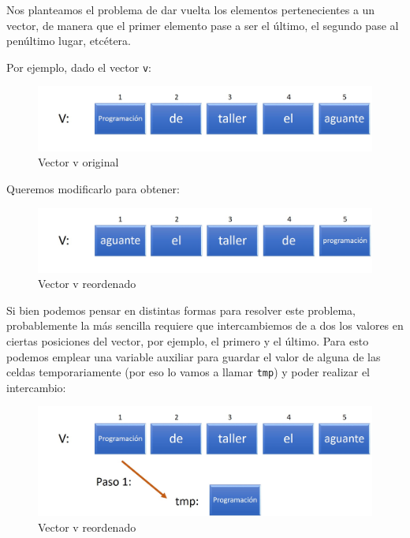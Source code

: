 \documentclass[]{book}
\begin{document}
Nos planteamos el problema de dar vuelta los elementos pertenecientes a
un vector, de manera que el primer elemento pase a ser el último, el
segundo pase al penúltimo lugar, etcétera.

Por ejemplo, dado el vector \texttt{v}:

\begin{figure}

{\centering \includegraphics[width=0.8\linewidth]{images/14_invertir1} 

}

\caption{Vector v original}\label{fig:inv1}
\end{figure}

Queremos modificarlo para obtener:

\begin{figure}

{\centering \includegraphics[width=0.8\linewidth]{images/15_invertir1} 

}

\caption{Vector v reordenado}\label{fig:inv2}
\end{figure}

Si bien podemos pensar en distintas formas para resolver este problema,
probablemente la más sencilla requiere que intercambiemos de a dos los
valores en ciertas posiciones del vector, por ejemplo, el primero y el
último. Para esto podemos emplear una variable auxiliar para guardar el
valor de alguna de las celdas temporariamente (por eso lo vamos a llamar
\texttt{tmp}) y poder realizar el intercambio:

\begin{figure}

{\centering \includegraphics[width=0.8\linewidth]{images/16_invertir} 

}

\caption{Vector v reordenado}\label{fig:inv3}
\end{figure}
\end{document}
